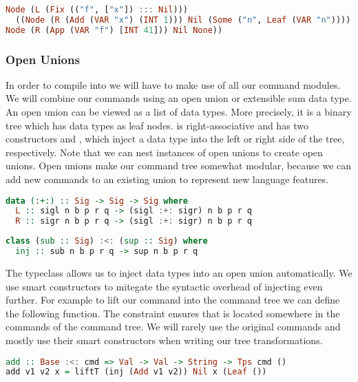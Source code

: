 \begin{lstlisting}[language=Haskell]
Node (L (Fix (("f", ["x"]) ::: Nil)))
  ((Node (R (Add (VAR "x") (INT 1))) Nil (Some ("n", Leaf (VAR "n")))) ::: Nil) (Some ("",
Node (R (App (VAR "f") [INT 41])) Nil None))
\end{lstlisting}

\subsubsection{\label{subsection:openunion}Open Unions}
In order to compile  into  we will have to make use of all our command modules. We will combine our commands using an open union or extensible sum data type. An open union can be viewed as a list of data types. More precisely, it is a binary tree which has data types as leaf nodes. \icode{:+:} is right-associative and has two constructors  and , which inject a data type into the left or right side of the tree, respectively. Note that we can nest instances of open unions to create open unions. Open unions make our command tree somewhat modular, because we can add new commands to an existing union to represent new language features.

\begin{lstlisting}[language=Haskell]
data (:+:) :: Sig -> Sig -> Sig where
  L :: sigl n b p r q -> (sigl :+: sigr) n b p r q
  R :: sigr n b p r q -> (sigl :+: sigr) n b p r q
\end{lstlisting}

\begin{lstlisting}[language=Haskell]
class (sub :: Sig) :<: (sup :: Sig) where
  inj :: sub n b p r q -> sup n b p r q
\end{lstlisting}

The typeclass \icode{:<:} allows us to inject data types into an open union automatically. We use smart constructors to mitegate the syntactic overhead of injecting \autocite{DBLP:conf/haskell/WuSH14, DBLP:conf/popl/LiangHJ95} even further. For example to lift our  command into the command tree we can define the following function. The constraint  ensures that  is located somewhere in the commands of the command tree. We will rarely use the original commands and mostly use their smart constructors when writing our tree transformations.

\begin{lstlisting}[language=Haskell]
add :: Base :<: cmd => Val -> Val -> String -> Tps cmd ()
add v1 v2 x = liftT (inj (Add v1 v2)) Nil x (Leaf ())
\end{lstlisting}

